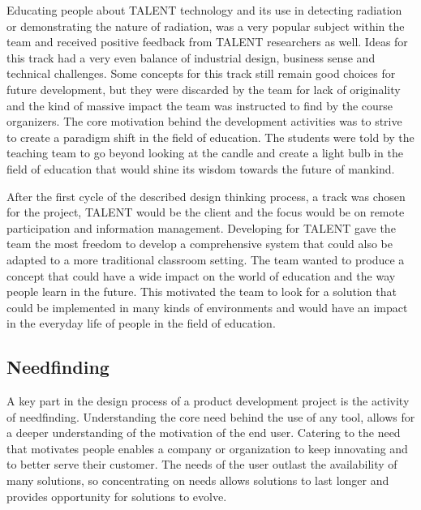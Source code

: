 \documentclass[english,12pt,a4paper,dvips]{article}
\begin{document}
Educating people about TALENT technology and its use in detecting radiation or demonstrating the nature of radiation, was a very popular subject within the team and received positive feedback from TALENT researchers as well. Ideas for this track had a very even balance of industrial design, business sense and technical challenges. Some concepts for this track still remain good choices for future development, but they were discarded by the team for lack of originality and the kind of massive impact the team was instructed to find by the course organizers. The core motivation behind the development activities was to strive to create a paradigm shift in the field of education. The students were told by the teaching team to go beyond looking at the candle and create a light bulb in the field of education that would shine its wisdom towards the future of mankind.

After the first cycle of the described design thinking process, a track was chosen for the project, TALENT would be the client and the focus would be on remote participation and information management. Developing for TALENT gave the team the most freedom to develop a comprehensive system that could also be adapted to a more traditional classroom setting. The team wanted to produce a concept that could have a wide impact on the world of education and the way people learn in the future. This motivated the team to look for a solution that could be implemented in many kinds of environments and would have an impact in the everyday life of people in the field of education.


\subsection{Needfinding}

A key part in the design process of a product development project is the activity of needfinding. Understanding the core need behind the use of any tool, allows for a deeper understanding of the motivation of the end user. Catering to the need that motivates people enables a company or organization to keep innovating and to better serve their customer. The needs of the user outlast the availability of many solutions, so concentrating on needs allows solutions to last longer and provides opportunity for solutions to evolve. \cite{Patnaik} 
\end{document}
